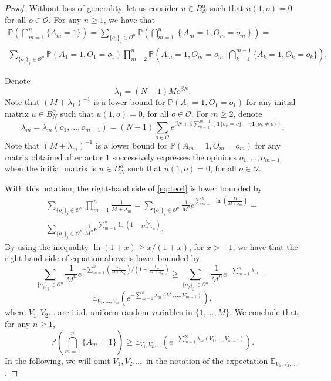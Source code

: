 \documentclass[11pt]{article}
\theoremstyle{definition}
\newcommand{\opn}{\mathcal{O}}
\def\P{{\mathbb P}}
\begin{document}
\begin{proof}
Without loss of generality, 
let us consider $u \in B_N^{\alpha}$ such that $u(1,o)=0$ for all $o \in \opn$. For any $n\geq 1$, we have that
\begin{multline} \label{eq:teo4}
\P\left( \bigcap_{m=1}^{n}\{ A_m = 1\}\right)=\sum_{\{o_j\}_j \in \opn^n}\P\left( \bigcap_{m=1}^{n}\left\{ A_m = 1, O_m=o_m\right\}\right)= \\
\sum_{\{o_j\}_j \in \opn^n}\P(A_1=1,O_1=o_1)
\prod_{m=2}^n\P\left(A_m=1,O_m=o_m\ \Big| \bigcap_{k=1}^{m-1} \{A_k=1,O_k=o_k\} \right).
\end{multline}

Denote
$$
\lambda_1=(N-1)Me^{\beta N}.
$$
Note that $(M+\lambda_1)^{-1}$ is a lower bound for $\P(A_1=1,O_1=o_1)$ for any initial matrix $u \in B_N^{\alpha}$ such that $u(1,o)=0$, for all $o \in \opn$. For $m\geq 2$, denote
\begin{equation} \label{def:lambdam}
\lambda_m=\lambda_m(o_1,\ldots,o_{m-1})=(N-1)\sum_{o\in \opn }e^{\beta N+\beta\sum_{k=1}^{m-1}(\mathbf{1}\{o_k=o\}-\gamma\mathbf{1}\{o_k\neq o\})}.
\end{equation}
Note that $(M+\lambda_m)^{-1}$ is a lower bound for $\P(A_m=1,O_m=o_m)$ for any matrix obtained after actor $1$  successively expresses the opinions $o_1, \ldots, o_{m-1}$ when the initial matrix is $u \in B_N^{\alpha}$ such that $u(1,o)=0$, for all $o \in \opn$. 

With this notation, the right-hand side of \eqref{eq:teo4} is lower bounded by
\begin{multline*}
    \sum_{\{o_j\}_j \in \opn^n}
\prod_{m=1}^n\frac{1}{M+\lambda_m} = \sum_{\{o_j\}_j \in \opn^n} \frac{1}{M^n}e^{
\sum_{m=1}^n\ln\left(\frac{M}{M+\lambda_m}\right)}=
\\ \sum_{\{o_j\}_j \in \opn^n} \frac{1}{M^n}e^{
\sum_{m=1}^n\ln\left(1-\frac{\lambda_m}{M+\lambda_m}\right)}.
\end{multline*}
By using the inequality $\ln(1+x)\geq x/(1+x)$, for $x>-1$, we have that
the right-hand side of equation above is lower bounded by
$$
\sum_{\{o_j\}_j \in \opn^n} \frac{1}{M^n}e^{
-\sum_{m=1}^n\left(\frac{\lambda_m}{M+\lambda_m}\right)\Big/\left(1-\frac{\lambda_m}{M+\lambda_m}\right)} \geq \sum_{\{o_j\}_j \in \opn^n} \frac{1}{M^n}e^{
-\sum_{m=1}^n\lambda_m}=
$$
$$
\mathbb{E}_{V_1,\ldots, V_n}\left(e^{-\sum_{m=1}^{n}\lambda_m(V_1,\dots,V_{m-1})} \right),
$$
where $V_1,V_2 \ldots$ are i.i.d. uniform random variables in $\{1,\ldots, M\}$. 
We conclude that, for any $n\geq 1$,
$$
\P\left( \bigcap_{m=1}^{n}\{ A_m = 1\}\right) \geq \mathbb{E}_{V_1,V_2,\ldots}\left(e^{-\sum_{m=1}^{\infty}\lambda_m(V_1,\dots,V_{m-1})} \right).
$$
In the following, we will omit $V_1,V_2\ldots,$ in the notation of the expectation $\mathbb{E}_{V_1,V_2,\ldots}$.


\end{proof}
\end{document}
